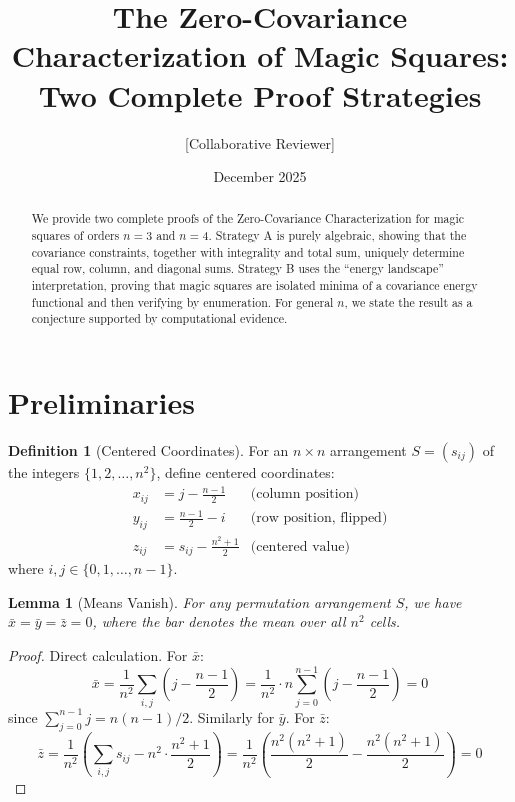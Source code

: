 \documentclass[11pt]{article}
\title{The Zero-Covariance Characterization of Magic Squares:\\
Two Complete Proof Strategies}
\author{[Collaborative Reviewer]}
\date{December 2025}
\newtheorem{lemma}[theorem]{Lemma}
\theoremstyle{definition}
\newtheorem{definition}[theorem]{Definition}
\theoremstyle{remark}
\begin{document}
\maketitle

\begin{abstract}
We provide two complete proofs of the Zero-Covariance Characterization for magic squares of orders $n=3$ and $n=4$. Strategy A is purely algebraic, showing that the covariance constraints, together with integrality and total sum, uniquely determine equal row, column, and diagonal sums. Strategy B uses the ``energy landscape'' interpretation, proving that magic squares are isolated minima of a covariance energy functional and then verifying by enumeration. For general $n$, we state the result as a conjecture supported by computational evidence.
\end{abstract}

\section{Preliminaries}

\begin{definition}[Centered Coordinates]
For an $n \times n$ arrangement $S = (s_{ij})$ of the integers $\{1, 2, \ldots, n^2\}$, define centered coordinates:
\begin{align}
x_{ij} &= j - \frac{n-1}{2} & \text{(column position)} \\
y_{ij} &= \frac{n-1}{2} - i & \text{(row position, flipped)} \\
z_{ij} &= s_{ij} - \frac{n^2+1}{2} & \text{(centered value)}
\end{align}
where $i, j \in \{0, 1, \ldots, n-1\}$.
\end{definition}

\begin{lemma}[Means Vanish]
For any permutation arrangement $S$, we have $\bar{x} = \bar{y} = \bar{z} = 0$, where the bar denotes the mean over all $n^2$ cells.
\end{lemma}

\begin{proof}
Direct calculation. For $\bar{x}$:
\[
\bar{x} = \frac{1}{n^2} \sum_{i,j} \left( j - \frac{n-1}{2} \right) = \frac{1}{n^2} \cdot n \sum_{j=0}^{n-1} \left( j - \frac{n-1}{2} \right) = 0
\]
since $\sum_{j=0}^{n-1} j = n(n-1)/2$. Similarly for $\bar{y}$. For $\bar{z}$:
\[
\bar{z} = \frac{1}{n^2} \left( \sum_{i,j} s_{ij} - n^2 \cdot \frac{n^2+1}{2} \right) = \frac{1}{n^2} \left( \frac{n^2(n^2+1)}{2} - \frac{n^2(n^2+1)}{2} \right) = 0
\]
\end{proof}
\end{document}
